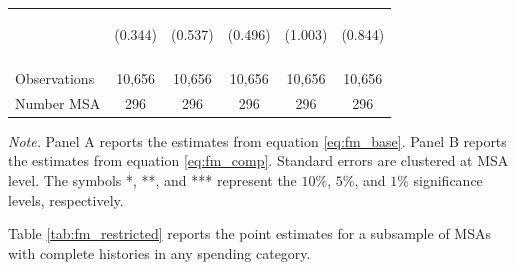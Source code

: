 \documentclass[dv_diss_main.tex]{subfiles}
\begin{document}
\begin{table}[H]
\begin{center}
{\begin{tabular}{lccccc}
     & \begin{footnotesize}(0.344)\end{footnotesize} & \begin{footnotesize}(0.537)\end{footnotesize} & \begin{footnotesize}(0.496)\end{footnotesize} & \begin{footnotesize}(1.003)\end{footnotesize} & \begin{footnotesize}(0.844)\end{footnotesize} \\

    \vspace{4pt} & \begin{footnotesize}\end{footnotesize} & \begin{footnotesize}\end{footnotesize} & \begin{footnotesize}\end{footnotesize} & \begin{footnotesize}\end{footnotesize} & \begin{footnotesize}\end{footnotesize} \\
    \hline
    Observations & 10,656 & 10,656 & 10,656 & 10,656 & 10,656 \\
    Number MSA & 296 & 296 & 296 & 296 & 296 \\
    \hline
    \end{tabular}
    }
    \label{tab:fm_percapita}
    \end{center}
        
    \footnotesize{\textit{Note. }Panel A reports the estimates from equation \eqref{eq:fm_base}. Panel B reports the estimates from equation \eqref{eq:fm_comp}. Standard errors are clustered at MSA level. The symbols *, **, and *** represent the $10\%$, $5\%$, and $1\%$ significance levels, respectively.}
\end{table}

\newpage 
Table \ref{tab:fm_restricted} reports the point estimates for a subsample of MSAs with complete histories in any spending category.
\end{document}
